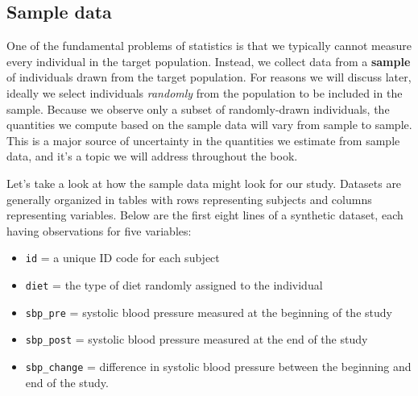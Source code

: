 \documentclass[
]{book}
\begin{document}
\subsection{Sample data}\label{sample-data}

One of the fundamental problems of statistics is that we typically cannot measure every individual in the target population. Instead, we collect data from a \textbf{sample} of individuals drawn from the target population. For reasons we will discuss later, ideally we select individuals \emph{randomly} from the population to be included in the sample. Because we observe only a subset of randomly-drawn individuals, the quantities we compute based on the sample data will vary from sample to sample. This is a major source of uncertainty in the quantities we estimate from sample data, and it's a topic we will address throughout the book.

Let's take a look at how the sample data might look for our study. Datasets are generally organized in tables with rows representing subjects and columns representing variables. Below are the first eight lines of a synthetic dataset, each having observations for five variables:

\begin{itemize}
\item
  \texttt{id} = a unique ID code for each subject
\item
  \texttt{diet} = the type of diet randomly assigned to the individual
\item
  \texttt{sbp\_pre} = systolic blood pressure measured at the beginning of the study
\item
  \texttt{sbp\_post} = systolic blood pressure measured at the end of the study
\item
  \texttt{sbp\_change} = difference in systolic blood pressure between the beginning and end of the study.
\end{itemize}
\end{document}
